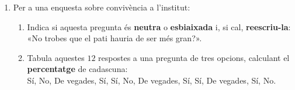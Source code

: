 \begin{enumerate}[label=\textbf{\arabic*.}, leftmargin=2em, itemsep=8pt, start=5]
  \item Per a una enquesta sobre convivència a l'institut:
    \begin{enumerate}[label=\alph*), leftmargin=1.6em, topsep=2pt]
      \item Indica si aquesta pregunta és \textbf{neutra} o \textbf{esbiaixada} i, si
            cal, \textbf{reescriu-la}: «No trobes que el pati hauria de ser més gran?».
      \item Tabula aquestes $12$ respostes a una pregunta de tres opcions, calculant
            el \textbf{percentatge} de cadascuna:\\
            Sí, No, De vegades, Sí, Sí, No, De vegades, Sí, Sí, De vegades, Sí, No.
    \end{enumerate}
\end{enumerate}

